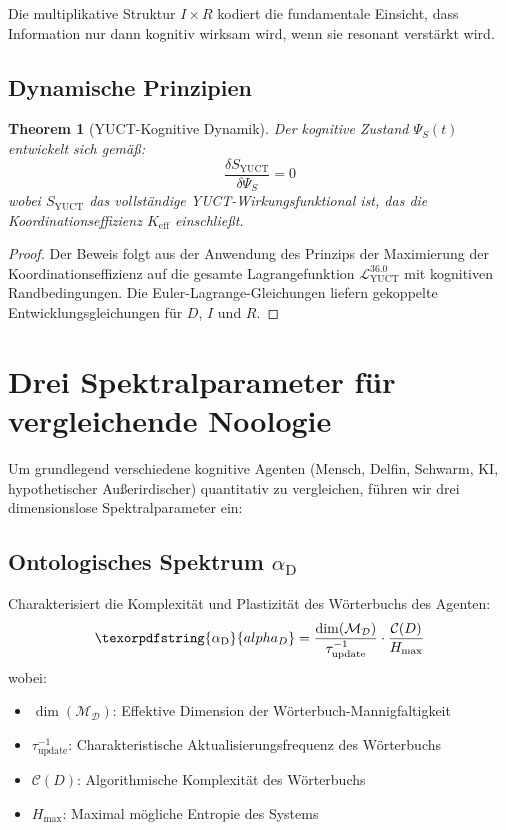 \documentclass[12pt,a4paper]{article}
\newtheorem{theorem}{Theorem}
\DeclareRobustCommand{\alD}{\texorpdfstring{\ensuremath{\alpha_{\mathrm{D}}}}{alpha_D}}
\newcommand{\eff}{\mathrm{eff}}
\newcommand{\Dict}{\mathcal{D}}
\newcommand{\Mdict}{\mathcal{M}_{\Dict}}
\newcommand{\Ke}{K_{\eff}}
\begin{document}
	Die multiplikative Struktur \(I \times R\) kodiert die fundamentale Einsicht, dass Information nur dann kognitiv wirksam wird, wenn sie resonant verstärkt wird.
	
	\subsection{Dynamische Prinzipien}
	
	\begin{theorem}[YUCT-Kognitive Dynamik]
		Der kognitive Zustand \(\Psi_S(t)\) entwickelt sich gemäß:
		\begin{equation}
			\label{eq:cognitive-dynamics}
			\frac{\delta S_{\mathrm{YUCT}}}{\delta \Psi_S} = 0
		\end{equation}
		wobei \(S_{\mathrm{YUCT}}\) das vollständige YUCT-Wirkungsfunktional ist, das die Koordinationseffizienz \(\Ke\) einschließt.
	\end{theorem}
	
	\begin{proof}
		Der Beweis folgt aus der Anwendung des Prinzips der Maximierung der Koordinationseffizienz auf die gesamte Lagrangefunktion \(\mathcal{L}_{\mathrm{YUCT}}^{36.0}\) mit kognitiven Randbedingungen. Die Euler-Lagrange-Gleichungen liefern gekoppelte Entwicklungsgleichungen für \(D\), \(I\) und \(R\).
	\end{proof}
	
	\section{Drei Spektralparameter für vergleichende Noologie}
	
	Um grundlegend verschiedene kognitive Agenten (Mensch, Delfin, Schwarm, KI, hypothetischer Außerirdischer) quantitativ zu vergleichen, führen wir drei dimensionslose Spektralparameter ein:
	
	\subsection{Ontologisches Spektrum \alD}
	
	Charakterisiert die Komplexität und Plastizität des Wörterbuchs des Agenten:
	\begin{equation}
		\label{eq:alphaD}
		\alD = \frac{\dim(\Mdict)}{\tau_{\mathrm{update}}^{-1}} \cdot \frac{\mathcal{C}(D)}{H_{\mathrm{max}}}
	\end{equation}
	wobei:
	\begin{itemize}
		\item \(\dim(\Mdict)\): Effektive Dimension der Wörterbuch-Mannigfaltigkeit
		\item \(\tau_{\mathrm{update}}^{-1}\): Charakteristische Aktualisierungsfrequenz des Wörterbuchs
		\item \(\mathcal{C}(D)\): Algorithmische Komplexität des Wörterbuchs
		\item \(H_{\mathrm{max}}\): Maximal mögliche Entropie des Systems
	\end{itemize}
	
\end{document}
